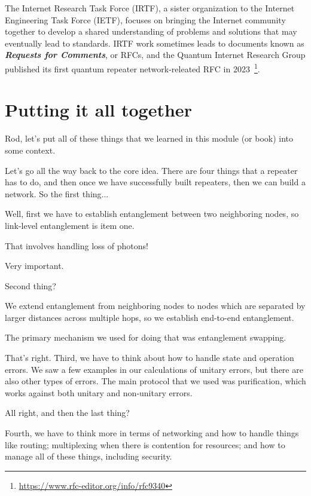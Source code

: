 The Internet Research Task Force (IRTF), a sister organization to the Internet Engineering Task Force (IETF), focuses on bringing the Internet community together to develop a shared understanding of problems and solutions that may eventually lead to standards. IRTF work sometimes leads to documents known as \textbf{\emph{Requests for Comments}}, or RFCs, and the Quantum Internet Research Group published its first quantum repeater network-releated RFC in 2023~\footnote{\url{https://www.rfc-editor.org/info/rfc9340}}.



\section{Putting it all together}
\label{sec:putting-it-all-together}


\mmm Rod, let's put all of these things that we learned in this module (or book) into some context.

\rrr Let's go all the way back to the core idea. There are four things that a repeater has to do, and then once we have  successfully built repeaters, then we can build a network. So the first thing...

\mmm Well, first we have to establish entanglement between two neighboring nodes, so link-level entanglement is item one.

\rrr That involves handling loss of photons!

\mmm Very important.

\rrr Second thing?

\mmm We extend entanglement from neighboring nodes to nodes which are separated by larger distances across multiple hops, so we establish end-to-end entanglement.

\rrr The primary mechanism we used for doing that was entanglement swapping. 

\mmm That's right.
Third, we have to think about how to handle state and operation errors. We saw a few examples in our calculations of unitary errors, but there are also other types of errors. The main protocol that we used was purification, which works against both unitary and non-unitary errors.

\rrr All right, and then the last thing?

\mmm Fourth, we have to think more in terms of networking and how to handle things like routing; multiplexing when there is contention for resources; and how to manage all of these things, including security.

